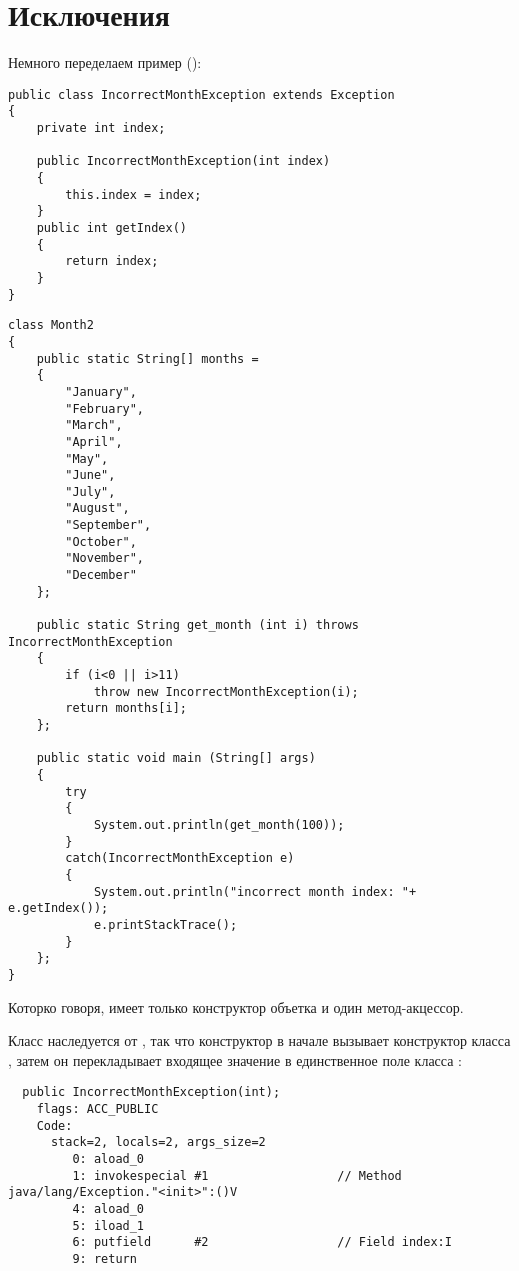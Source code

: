 \section{Исключения}

Немного переделаем пример  ():

\begin{lstlisting}[caption=IncorrectMonthException.java]
public class IncorrectMonthException extends Exception
{
	private int index;

	public IncorrectMonthException(int index)
	{
		this.index = index;
	} 
	public int getIndex()
	{
		return index;
	}
}
\end{lstlisting}

\begin{lstlisting}[caption=Month2.java]
class Month2
{
	public static String[] months = 
	{
		"January", 
		"February", 
		"March", 
		"April",
		"May",
		"June",
		"July",
		"August",
		"September",
		"October",
		"November",
		"December"
	};

	public static String get_month (int i) throws IncorrectMonthException
	{
		if (i<0 || i>11)
			throw new IncorrectMonthException(i);
		return months[i];
	};

	public static void main (String[] args)
	{
		try
		{
			System.out.println(get_month(100));
		}
		catch(IncorrectMonthException e)
		{
			System.out.println("incorrect month index: "+ e.getIndex());
			e.printStackTrace();
		}
	};
}
\end{lstlisting}

Которко говоря,  имеет только конструктор объетка и один
метод-акцессор.

Класс  наследуется от , 
так что конструктор 
в начале вызывает конструктор класса , 
затем он перекладывает входящее значение в единственное поле класса :

\begin{lstlisting}
  public IncorrectMonthException(int);
    flags: ACC_PUBLIC
    Code:
      stack=2, locals=2, args_size=2
         0: aload_0       
         1: invokespecial #1                  // Method java/lang/Exception."<init>":()V
         4: aload_0       
         5: iload_1       
         6: putfield      #2                  // Field index:I
         9: return        
\end{lstlisting}

